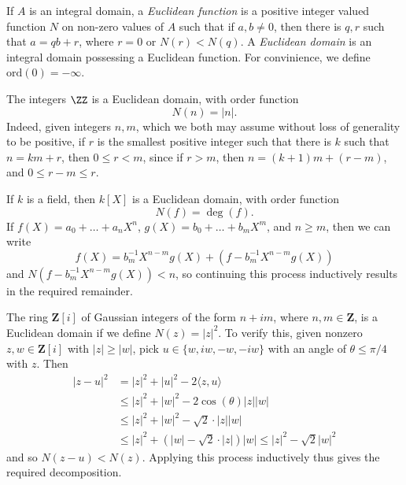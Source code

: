 If $A$ is an integral domain, a \emph{Euclidean function} is a positive integer valued function $N$ on non-zero values of $A$ such that if $a,b \neq 0$, then there is $q,r$ such that $a = qb + r$, where $r = 0$ or $N(r) < N(q)$. A \emph{Euclidean domain} is an integral domain possessing a Euclidean function. For convinience, we define $\text{ord}(0) = -\infty$.

\begin{example}
    The integers $\ZZ$ is a Euclidean domain, with order function
    \[ N(n) = |n|. \]
    Indeed, given integers $n,m$, which we both may assume without loss of generality to be positive, if $r$ is the smallest positive integer such that there is $k$ such that $n = km + r$, then $0 \leq r < m$, since if $r > m$, then $n = (k+1)m + (r - m)$, and $0 \leq r-m \leq r$.
\end{example}

\begin{example}
    If $k$ is a field, then $k[X]$ is a Euclidean domain, with order function
    \[ N(f) = \deg(f). \]
    If $f(X) = a_0 + \dots + a_nX^n$, $g(X) = b_0 + \dots + b_mX^m$, and $n \geq m$, then we can write
    \[ f(X) = b_m^{-1} X^{n-m} g(X) + (f - b_m^{-1} X^{n-m}g(X)) \]
    and $N(f - b_m^{-1} X^{n-m}g(X)) < n$, so continuing this process inductively results in the required remainder.
\end{example}

\begin{example}
    The ring $\mathbf{Z}[i]$ of Gaussian integers of the form $n + im$, where $n,m \in \mathbf{Z}$, is a Euclidean domain if we define $N(z) = |z|^2$. To verify this, given nonzero $z,w \in \mathbf{Z}[i]$ with $|z| \geq |w|$, pick $u \in \{ w, iw, -w, -iw \}$ with an angle of $\theta \leq \pi/4$ with $z$. Then
    \begin{align*}
        |z - u|^2 &= |z|^2 + |u|^2 - 2 \langle z, u \rangle\\
        &\leq |z|^2 + |w|^2 - 2 \cos(\theta) |z||w|\\
        &\leq |z|^2 + |w|^2 - \sqrt{2} \cdot |z||w|\\
        &\leq |z|^2 + (|w| - \sqrt{2} \cdot |z|) |w| \leq |z|^2 - \sqrt{2} |w|^2
    \end{align*}
    and so $N(z-u) < N(z)$. Applying this process inductively thus gives the required decomposition.
\end{example}


